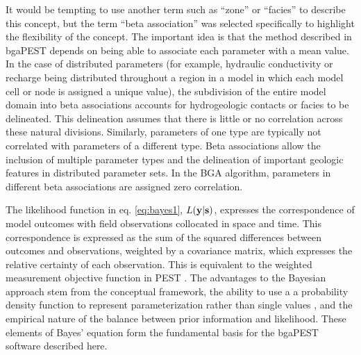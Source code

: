 \documentclass[11pt,oneside,onecolumn]{usgsreport}
\begin{document}
\begin{multicols}{2}
\begin{bibunit}
It would be tempting to use another term such as ``zone'' or ``facies''
to describe this concept, but the term ``beta association'' was selected
specifically to highlight the flexibility of the concept. The important
idea is that the method described in bgaPEST depends on being able
to associate each parameter with a mean value. In the case of distributed
parameters (for example, hydraulic conductivity or recharge being
distributed throughout a region in a model in which each model cell
or node is assigned a unique value), the subdivision of the entire
model domain into beta associations accounts for hydrogeologic contacts
or facies to be delineated. This delineation assumes that there is
little or no correlation across these natural divisions. Similarly,
parameters of one type are typically not correlated with parameters
of a different type. Beta associations allow the inclusion of multiple
parameter types and the delineation of important geologic features
in distributed parameter sets. In the BGA algorithm, parameters in
different beta associations are assigned zero correlation.

The likelihood function in eq. \ref{eq:bayes1}, $L\text{\ensuremath{\left(\mathbf{y}|\mathbf{s}\right)}}$,
expresses the correspondence of model outcomes with field observations
collocated in space and time. This correspondence is expressed as
the sum of the squared differences between outcomes and observations,
weighted by a covariance matrix, which expresses the relative certainty
of each observation. This is equivalent to the weighted measurement
objective function in PEST \citep{PEST}. The advantages to the Bayesian
approach stem from the conceptual framework, the ability to use a
a probability density function to represent parameterization rather
than single values , and the empirical nature of the balance between
prior information and likelihood. These elements of Bayes' equation
form the fundamental basis for the bgaPEST software described here.


\end{bibunit}
\end{multicols}
\end{document}
